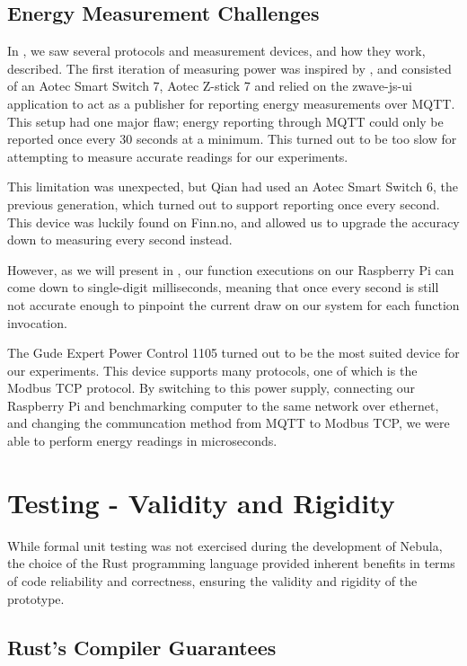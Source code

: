 \documentclass[
  table]{report}
\begin{document}
\subsection{Energy Measurement Challenges}
\label{sect:energy_challenges}

In , we saw several protocols and
measurement devices, and how they work, described. The first iteration
of measuring power was inspired by
\citet{qianEnergyFootprintingWordPress2022}, and consisted of an Aotec
Smart Switch 7, Aotec Z-stick 7 and relied on the zwave-js-ui
application to act as a publisher for reporting energy measurements over
\ac{MQTT}. This setup had one major flaw; energy reporting through
\ac{MQTT} could only be reported once every 30 seconds at a minimum.
This turned out to be too slow for attempting to measure accurate
readings for our experiments.

This limitation was unexpected, but Qian had used an Aotec Smart Switch
6, the previous generation, which turned out to support reporting once
every second. This device was luckily found on Finn.no, and allowed us
to upgrade the accuracy down to measuring every second instead.

However, as we will present in , our function
executions on our Raspberry Pi can come down to single-digit
milliseconds, meaning that once every second is still not accurate
enough to pinpoint the current draw on our system for each function
invocation.

The Gude Expert Power Control 1105 turned out to be the most suited
device for our experiments. This device supports many protocols, one of
which is the Modbus TCP protocol. By switching to this power supply,
connecting our Raspberry Pi and benchmarking computer to the same
network over ethernet, and changing the communcation method from
\ac{MQTT} to Modbus TCP, we were able to perform energy readings in
microseconds.

\section{Testing - Validity and Rigidity}

While formal unit testing was not exercised during the development of
Nebula, the choice of the Rust programming language provided inherent
benefits in terms of code reliability and correctness, ensuring the
validity and rigidity of the prototype.

\subsection{Rust's Compiler Guarantees}
\end{document}
